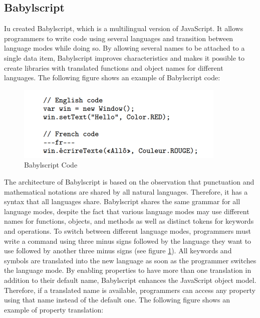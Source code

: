 \subsection{Babylscript}
 Iu \cite{iu2011babylscript} created Babylscript, which is a multilingual version of JavaScript. It allows programmers to write code using several languages and transition between language modes while doing so. By allowing several names to be attached to a single data item, Babylscript improves characteristics and makes it possible to create libraries with translated functions and object names for different languages. The following figure shows an example of Babylscript code:
\begin{figure}[ht]
\centering
\includegraphics[width=10cm]{ch2-images/babylscript.png}
\caption{Babylscript Code \cite{iu2011babylscript}}
\label{fig:Babylscript Code}
\end{figure}

The architecture of Babylscript is based on the observation that punctuation and mathematical notations are shared by all natural languages. Therefore, it has a syntax that all languages share. Babylscript shares the same grammar for all language modes, despite the fact that various language modes may use different names for functions, objects, and methods as well as distinct tokens for keywords and operations. To switch between different language modes, programmers must write a command using three minus signs followed by the language they want to use followed by another three minus signs (see figure \ref{fig:Babylscript Code}). All keywords and symbols are translated into the new language as soon as the programmer switches the language mode. By enabling properties to have more than one translation in addition to their default name, Babylscript enhances the JavaScript object model. Therefore, if a translated name is available, programmers can access any property using that name instead of the default one. The following figure shows an example of property translation:

